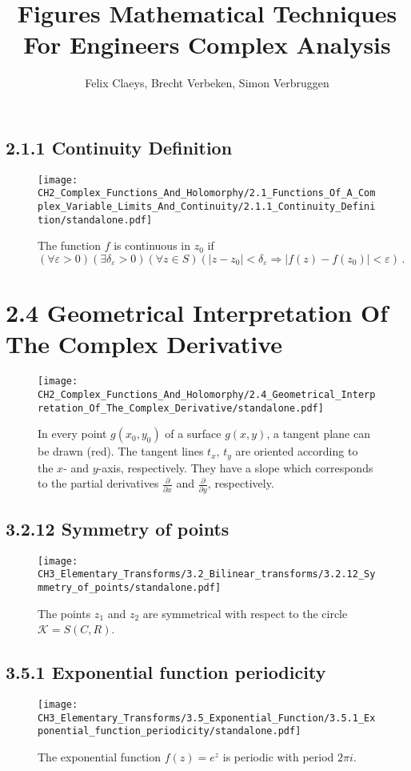 \documentclass{book}
\title{Figures Mathematical Techniques For Engineers Complex Analysis}
\author{Felix Claeys, Brecht Verbeken, Simon Verbruggen}
\begin{document}
\maketitle
\subsection*{2.1.1 Continuity Definition}
\begin{figure}[H]
\centering
\texttt{[image: CH2\_Complex\_Functions\_And\_Holomorphy/2.1\_Functions\_Of\_A\_Complex\_Variable\_Limits\_And\_Continuity/2.1.1\_Continuity\_Definition/standalone.pdf]}
\caption{The function $f$ is continuous in $z_0$ if $( \forall \varepsilon > 0)(\exists \delta_\varepsilon > 0)(\forall z \in S)(\lvert z-z_0 \rvert<\delta_\varepsilon \Longrightarrow \lvert f(z) - f(z_0) \rvert<\varepsilon)\, . $}
\end{figure}

\section*{2.4 Geometrical Interpretation Of The Complex Derivative}
\begin{figure}[H]
\centering
\texttt{[image: CH2\_Complex\_Functions\_And\_Holomorphy/2.4\_Geometrical\_Interpretation\_Of\_The\_Complex\_Derivative/standalone.pdf]}
\caption{In every point  $g(x_0, y_0)$ of a surface $g(x,y)$, a tangent plane can be drawn (red). The tangent lines $t_x$, $t_y$ are oriented according to the $x$- and $y$-axis, respectively. They have a slope which corresponds to the partial derivatives $\frac{\partial}{\partial x}$ and $\frac{\partial}{\partial y}$, respectively.}
\end{figure}

\subsection*{3.2.12 Symmetry of points}
\begin{figure}[H]
\centering
\texttt{[image: CH3\_Elementary\_Transforms/3.2\_Bilinear\_transforms/3.2.12\_Symmetry\_of\_points/standalone.pdf]}
\caption{The points $z_1$ and $z_2$ are symmetrical with respect to the circle $\mathcal{K} = S(C,R)$.}
\end{figure}

\subsection*{3.5.1 Exponential function periodicity}
\begin{figure}[H]
\centering
\texttt{[image: CH3\_Elementary\_Transforms/3.5\_Exponential\_Function/3.5.1\_Exponential\_function\_periodicity/standalone.pdf]}
\caption{The exponential function $f(z) =e^z$ is periodic with period $2 \pi i$.}
\end{figure}
\end{document}
